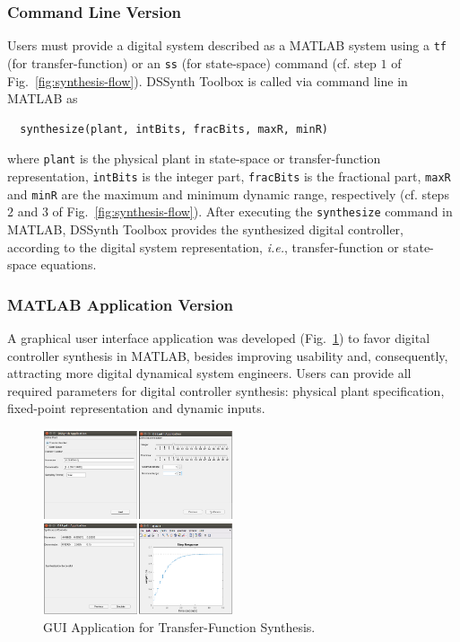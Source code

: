 \documentclass[sigconf]{acmart}
\newcommand\tool{{DSSynth Toolbox}\xspace}
\begin{document}
\subsubsection{Command Line Version}

Users must provide a digital system described as a MATLAB system 
using a \texttt{tf} (for transfer-function) or an \texttt{ss} (for state-space) 
command (cf. step $1$ of Fig.~\ref{fig:synthesis-flow}).
\tool is called via command line in MATLAB as 

\begin{verbatim}  synthesize(plant, intBits, fracBits, maxR, minR) \end{verbatim} 

\noindent where \texttt{plant} is the physical plant in state-space or transfer-function representation, 
\texttt{intBits} is the integer part, \texttt{fracBits} is the fractional part, \texttt{maxR} and \texttt{minR} 
are the maximum and minimum dynamic range, respectively (cf. steps $2$ and $3$ of Fig.~\ref{fig:synthesis-flow}).
%
After executing the \texttt{synthesize} command in MATLAB, 
\tool provides the synthesized digital controller, according to 
the digital system representation, {\it i.e.}, transfer-function or 
state-space equations. 

\subsubsection{MATLAB Application Version} 

A graphical user interface application was developed (Fig.~\ref{fig:gui-for-tf}) 
to favor digital controller synthesis in MATLAB, besides improving usability and, 
consequently, attracting more digital dynamical system engineers. Users can provide all 
required parameters for digital controller synthesis: physical plant specification, 
fixed-point representation and dynamic inputs. 
%
\begin{figure}
  \includegraphics[width=0.5\textwidth]{screens_dssynth.png}
  \caption{GUI Application for Transfer-Function Synthesis.}
  \label{fig:gui-for-tf}
\end{figure}
\end{document}
